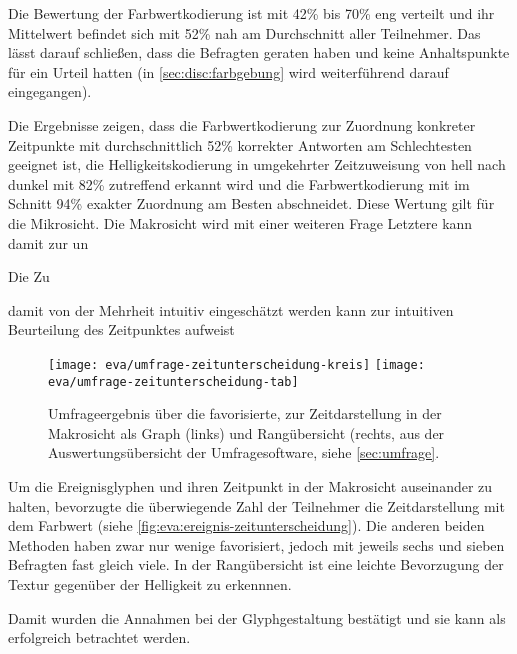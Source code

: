 Die Bewertung der Farbwertkodierung ist mit 42\% bis 70\% eng verteilt und ihr Mittelwert befindet sich mit 52\% nah am Durchschnitt aller Teilnehmer. Das lässt darauf schließen, dass die Befragten geraten haben und keine Anhaltspunkte für ein Urteil hatten (in \autoref{sec:disc:farbgebung} wird weiterführend darauf eingegangen). 

Die Ergebnisse zeigen, dass die Farbwertkodierung zur Zuordnung konkreter Zeitpunkte mit durchschnittlich 52\% korrekter Antworten am Schlechtesten geeignet ist, die Helligkeitskodierung in umgekehrter Zeitzuweisung von hell nach dunkel mit 82\% zutreffend erkannt wird und die Farbwertkodierung mit im Schnitt 94\% exakter Zuordnung am Besten abschneidet. Diese Wertung gilt für die Mikrosicht. Die Makrosicht wird mit einer weiteren Frage  Letztere kann damit zur un

Die Zu

damit von der Mehrheit intuitiv eingeschätzt werden kann zur intuitiven Beurteilung des Zeitpunktes aufweist

\begin{figure}
	\texttt{[image: eva/umfrage-zeitunterscheidung-kreis]}
	\hspace*{.04\textwidth}%
	\texttt{[image: eva/umfrage-zeitunterscheidung-tab]}
	\caption{Umfrageergebnis über die favorisierte,  zur Zeitdarstellung in der Makrosicht als Graph (links) und Rangübersicht (rechts, aus der Auswertungsübersicht der Umfragesoftware, siehe \autoref{sec:umfrage}.}\label{fig:eva:ereignis-zeitunterscheidung}
\end{figure}

Um die Ereignisglyphen und ihren Zeitpunkt in der Makrosicht auseinander zu halten, bevorzugte die überwiegende Zahl der Teilnehmer die Zeitdarstellung mit dem Farbwert (siehe \autoref{fig:eva:ereignis-zeitunterscheidung}). Die anderen beiden Methoden haben zwar nur wenige favorisiert, jedoch mit jeweils sechs und sieben Befragten fast gleich viele. In der Rangübersicht ist eine leichte Bevorzugung der Textur gegenüber der Helligkeit zu erkennnen.

Damit wurden die Annahmen bei der Glyphgestaltung bestätigt und sie kann als erfolgreich betrachtet werden.



